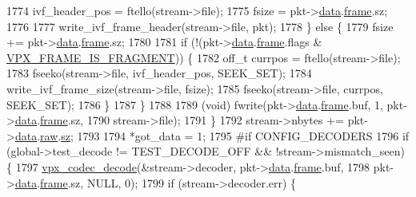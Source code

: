 \begin{DoxyCodeInclude}
{{{{{{{{{{{{{{{{{{{{{{{{{{{{{{{{{{{{{{{{{{{{{{{{{1774             ivf\_header\_pos = ftello(stream->file);
1775             fsize = pkt->\hyperlink{structvpx__codec__cx__pkt_a7f97b060a23b7e89fe5b885c0074f696}{data}.\hyperlink{structvpx__codec__cx__pkt_a81e33bf4408a3983abb16492fee359ff}{frame}.sz;
1776 
1777             write\_ivf\_frame\_header(stream->file, pkt);
1778           \} \textcolor{keywordflow}{else} \{
1779             fsize += pkt->\hyperlink{structvpx__codec__cx__pkt_a7f97b060a23b7e89fe5b885c0074f696}{data}.\hyperlink{structvpx__codec__cx__pkt_a81e33bf4408a3983abb16492fee359ff}{frame}.sz;
1780 
1781             \textcolor{keywordflow}{if} (!(pkt->\hyperlink{structvpx__codec__cx__pkt_a7f97b060a23b7e89fe5b885c0074f696}{data}.\hyperlink{structvpx__codec__cx__pkt_a81e33bf4408a3983abb16492fee359ff}{frame}.flags & \hyperlink{group__encoder_gafb9f7dbf9b8a764c521d8b12c0e6959d}{VPX\_FRAME\_IS\_FRAGMENT})) \{
1782               off\_t currpos = ftello(stream->file);
1783               fseeko(stream->file, ivf\_header\_pos, SEEK\_SET);
1784               write\_ivf\_frame\_size(stream->file, fsize);
1785               fseeko(stream->file, currpos, SEEK\_SET);
1786             \}
1787           \}
1788 
1789           (void) fwrite(pkt->\hyperlink{structvpx__codec__cx__pkt_a7f97b060a23b7e89fe5b885c0074f696}{data}.\hyperlink{structvpx__codec__cx__pkt_a81e33bf4408a3983abb16492fee359ff}{frame}.buf, 1, pkt->\hyperlink{structvpx__codec__cx__pkt_a7f97b060a23b7e89fe5b885c0074f696}{data}.\hyperlink{structvpx__codec__cx__pkt_a81e33bf4408a3983abb16492fee359ff}{frame}.sz,
1790                         stream->file);
1791         \}
1792         stream->nbytes += pkt->\hyperlink{structvpx__codec__cx__pkt_a7f97b060a23b7e89fe5b885c0074f696}{data}.\hyperlink{structvpx__codec__cx__pkt_acc7ee91ea9c907aea7c3b953324f7c26}{raw}.\hyperlink{structvpx__fixed__buf_a43d7f8247ed9752f65f0a7639817ae84}{sz};
1793 
1794         *got\_data = 1;
1795 \textcolor{preprocessor}{#if CONFIG\_DECODERS}
1796         \textcolor{keywordflow}{if} (global->test\_decode != TEST\_DECODE\_OFF && !stream->mismatch\_seen) \{
1797           \hyperlink{group__decoder_ga3441e157a7a69108bca9a069f2ee8e0d}{vpx\_codec\_decode}(&stream->decoder, pkt->\hyperlink{structvpx__codec__cx__pkt_a7f97b060a23b7e89fe5b885c0074f696}{data}.\hyperlink{structvpx__codec__cx__pkt_a81e33bf4408a3983abb16492fee359ff}{frame}.buf,
1798                            pkt->\hyperlink{structvpx__codec__cx__pkt_a7f97b060a23b7e89fe5b885c0074f696}{data}.\hyperlink{structvpx__codec__cx__pkt_a81e33bf4408a3983abb16492fee359ff}{frame}.sz, NULL, 0);
1799           \textcolor{keywordflow}{if} (stream->decoder.err) \{
}}}}}}}}}}}}}}}}}}}}}}}}}}}}}}}}}}}}}}}}}}}}}}}}}
\end{DoxyCodeInclude}
